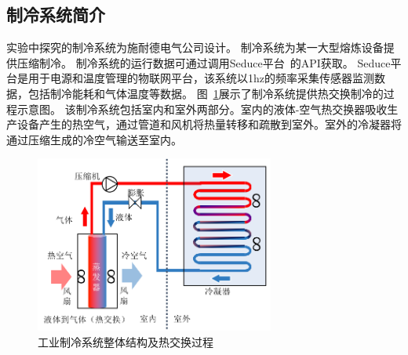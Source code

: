 \subsection{制冷系统简介}
\label{sec:ecotype_description}

实验中探究的制冷系统为施耐德电气公司设计。
制冷系统为某一大型熔炼设备提供压缩制冷。
制冷系统的运行数据可通过调用Seduce平台~\cite{SeducePastor2018}的API获取。
Seduce平台是用于电源和温度管理的物联网平台，该系统以1hz的频率采集传感器监测数据，包括制冷能耗和气体温度等数据。
图~\ref{fig:inrow_3dArchitecture}展示了制冷系统提供热交换制冷的过程示意图。
该制冷系统包括室内和室外两部分。室内的液体-空气热交换器吸收生产设备产生的热空气，通过管道和风机将热量转移和疏散到室外。室外的冷凝器将通过压缩生成的冷空气输送至室内。

\begin{figure}[!htbp]
  \centering
  \includegraphics[width=0.7\textwidth]{figures/chapter4/inrow_architecture.pdf}
  \caption{工业制冷系统整体结构及热交换过程}
\label{fig:inrow_3dArchitecture} 
\end{figure}

